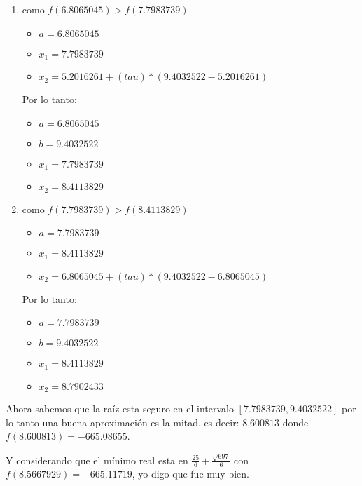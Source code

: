 \documentclass[12pt, fleqn]{article}                            %
\theoremstyle{break}                                            %
\begin{document}
\begin{enumerate}
            \clearpage

            \item como $f(6.8065045) > f(7.7983739)$
                \begin{itemize}
                    \item $a = 6.8065045$
                    \item $x_1 = 7.7983739$
                    \item $x_2 = 5.2016261+ (tau) * (9.4032522 - 5.2016261)$
                \end{itemize}

                Por lo tanto:
                \begin{itemize}
                    \item $a = 6.8065045$
                    \item $b = 9.4032522$
                    \item $x_1 = 7.7983739$
                    \item $x_2 = 8.4113829$
                \end{itemize}

            \item como $f(7.7983739) > f(8.4113829)$

                \begin{itemize}
                    \item $a = 7.7983739$
                    \item $x_1 = 8.4113829$
                    \item $x_2 = 6.8065045+ (tau) * (9.4032522 - 6.8065045)$
                \end{itemize}

                Por lo tanto:
                \begin{itemize}
                    \item $a = 7.7983739$
                    \item $b = 9.4032522$
                    \item $x_1 = 8.4113829$
                    \item $x_2 = 8.7902433$
                \end{itemize}

        \end{enumerate}
       
        Ahora sabemos que la raíz esta seguro en el intervalo $[7.7983739, 9.4032522]$ por lo tanto
        una buena aproximación es la mitad, es decir: $8.600813$ donde \\ $f(8.600813) = -665.08655$.

        Y considerando que el mínimo real esta en $ \frac{25}{6} + \frac{\sqrt{697}}{6}$ con $f(8.5667929) = -665.11719$, yo digo que fue muy bien.
        
\end{document}
